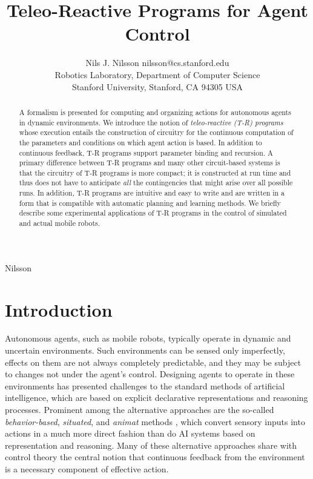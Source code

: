 
%
{Nilsson}



\title{Teleo-Reactive Programs for Agent Control}

\author{\name Nils J. Nilsson \email nilsson@cs.stanford.edu \\
       \addr Robotics Laboratory, Department of Computer Science \\
       Stanford University, Stanford, CA 94305 USA}

\maketitle
\begin{abstract}

A  formalism is presented for computing and organizing actions for autonomous  
agents in dynamic environments. We introduce the notion of {\it  
teleo-reactive (T-R) programs} whose execution entails the construction of  
circuitry for the continuous computation of the parameters and conditions on  
which agent action is based.  In addition to continuous feedback, T-R  
programs support parameter binding and recursion.  A primary difference  
between T-R programs and many other circuit-based systems is that the  
circuitry of T-R programs is more compact; it is constructed at run time and  
thus does not have to anticipate {\it all} the contingencies that might arise  
over all possible runs.  In addition, T-R programs are intuitive and easy to  
write and are written in a form that is compatible with automatic planning  
and learning methods.  We briefly describe some experimental applications of  
T-R programs in the control of simulated and actual mobile robots.  


\end{abstract}

\section{Introduction}

Autonomous agents, such as mobile robots, typically operate in dynamic and  
uncertain environments.  Such environments can be sensed only imperfectly,  
effects on them are not always completely predictable, and they may be  
subject to changes not under the agent's control.   Designing agents to  
operate in these environments has presented challenges to the standard   
methods of artificial intelligence,  which are based on explicit declarative  
representations and reasoning processes.  Prominent among the alternative  
approaches are the so-called {\it behavior-based}, {\it situated}, and {\it  
animat} methods \cite{Brooks,Maes,Kaelbling,Wilson}, which convert sensory  
inputs into actions in a much more direct fashion than do AI  systems based  
on representation and reasoning.  Many of these alternative approaches share  
with control theory the central notion that continuous feedback from the  
environment is a necessary component of effective action.

